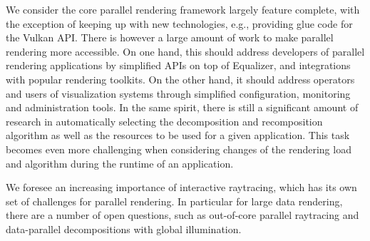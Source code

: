 We consider the core parallel rendering framework largely feature complete,
with the exception of keeping up with new technologies, e.g., providing glue
code for the Vulkan API. There is however a large amount of work to make
parallel rendering more accessible. On one hand, this should address developers
of parallel rendering applications by simplified APIs on top of Equalizer, and
integrations with popular rendering toolkits. On the other hand, it should
address operators and users of visualization systems through simplified
configuration, monitoring and administration tools. In the same spirit, there
is still a significant amount of research in automatically selecting the
decomposition and recomposition algorithm as well as the resources to be used
for a given application. This task becomes even more challenging when
considering changes of the rendering load and algorithm during the runtime of
an application.

We foresee an increasing importance of interactive raytracing, which has its
own set of challenges for parallel rendering. In particular for large data
rendering, there are a number of open questions, such as out-of-core parallel
raytracing and data-parallel decompositions with global illumination.
